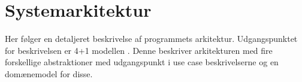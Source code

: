 \chapter{Systemarkitektur}
Her følger en detaljeret beskrivelse af programmets arkitektur. Udgangspunktet for beskrivelsen er 4+1 modellen \citep{fourPlusOne}. Denne beskriver arkitekturen med fire forskellige abstraktioner med udgangspunkt i use case beskrivelserne og en domænemodel for disse.






